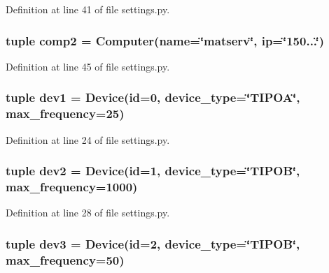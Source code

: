 \-Definition at line 41 of file settings.\-py.

\hypertarget{namespacesettings_afd4ef241a1a3e04a2fff8533e79fb803}{
\subsubsection[{comp2}]{\setlength{\rightskip}{0pt plus 5cm}tuple {\bf comp2} = \-Computer(name=\char`\"{}matserv\char`\"{}, ip=\char`\"{}150...\char`\"{})}}\label{namespacesettings_afd4ef241a1a3e04a2fff8533e79fb803}


\-Definition at line 45 of file settings.\-py.

\hypertarget{namespacesettings_a17246a9350ea91be0adf6e1f8530a79a}{
\subsubsection[{dev1}]{\setlength{\rightskip}{0pt plus 5cm}tuple {\bf dev1} = \-Device(id=0, device\-\_\-type=\char`\"{}\-T\-I\-P\-O\-A\char`\"{}, max\-\_\-frequency=25)}}\label{namespacesettings_a17246a9350ea91be0adf6e1f8530a79a}


\-Definition at line 24 of file settings.\-py.

\hypertarget{namespacesettings_a0682f4af7dbee49671213fabc04fa423}{
\subsubsection[{dev2}]{\setlength{\rightskip}{0pt plus 5cm}tuple {\bf dev2} = \-Device(id=1, device\-\_\-type=\char`\"{}\-T\-I\-P\-O\-B\char`\"{}, max\-\_\-frequency=1000)}}\label{namespacesettings_a0682f4af7dbee49671213fabc04fa423}


\-Definition at line 28 of file settings.\-py.

\hypertarget{namespacesettings_a07550322da8c1eb288349a016ca2fcea}{
\subsubsection[{dev3}]{\setlength{\rightskip}{0pt plus 5cm}tuple {\bf dev3} = \-Device(id=2, device\-\_\-type=\char`\"{}\-T\-I\-P\-O\-B\char`\"{}, max\-\_\-frequency=50)}}\label{namespacesettings_a07550322da8c1eb288349a016ca2fcea}


